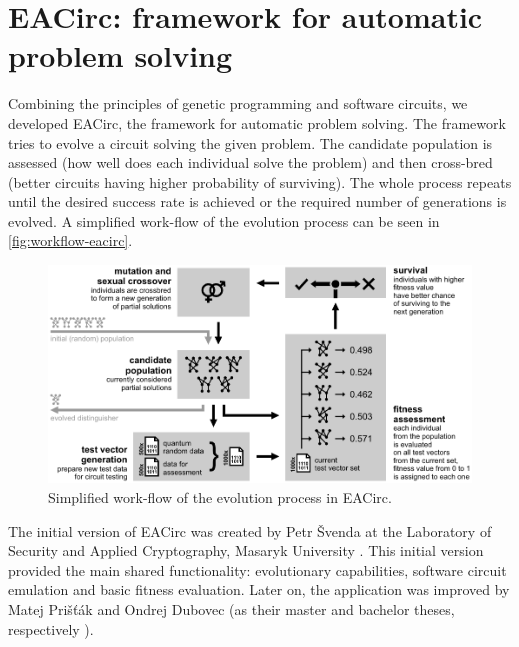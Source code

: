 \documentclass[12pt,twoside]{fithesis2}		%
\renewcommand{\_}{\leavevmode \kern0.0em\vbox{\hrule width0.4em}}
\begin{document}
\section{EACirc: framework for automatic problem solving}
\label{sec:eacirc-principles}

Combining the principles of genetic programming and software circuits, we developed EACirc, the framework for automatic
problem solving. The framework tries to evolve a circuit solving the given problem. The candidate population is assessed
(how well does each individual solve the problem) and then cross-bred (better circuits having higher probability of surviving).
The whole process repeats until the desired success rate is achieved or the required number of generations is evolved.
A simplified work-flow of the evolution process can be seen in \autoref{fig:workflow-eacirc}.

\begin{figure}[b!]
\centering
\includegraphics[width=\textwidth]{images/workflow-eacirc}
\caption{Simplified work-flow of the evolution process in EACirc.}
\label{fig:workflow-eacirc}
\end{figure}

The initial version of EACirc was created by Petr Švenda at 
the Laboratory of Security and Applied Cryptography, Masaryk University \parencite{labak}.
This initial version provided the main shared functionality: evolutionary capabilities, software circuit emulation
and basic fitness evaluation. Later on, the application was improved by Matej Prišťák and Ondrej Dubovec 
(as their master and bachelor theses, respectively \parencite{thesis-pristak, thesis-dubovec}).
\end{document}
